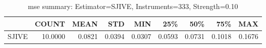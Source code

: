 \begin{table}[ht]
\centering
\caption{mse summary: Estimator=SJIVE, Instruments=333, Strength=0.10}
\begin{tabular}{lrrrrrrrr}
\toprule
 & COUNT & MEAN & STD & MIN & 25\% & 50\% & 75\% & MAX \\
\midrule
SJIVE & 10.0000 & 0.0821 & 0.0394 & 0.0307 & 0.0593 & 0.0731 & 0.1018 & 0.1676 \\
\bottomrule
\end{tabular}
\end{table}
